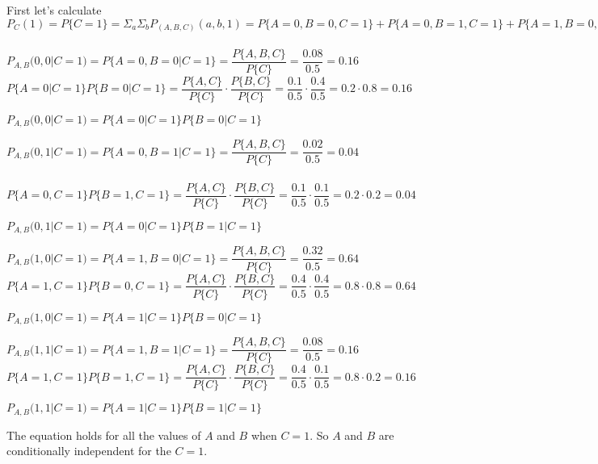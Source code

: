 \documentclass[12pt]{article}
\begin{document}
First let's calculate \\
$P_{C}(1) = P\{C = 1\} = \Sigma_{a} \Sigma_{b} P_{(A, B, C)} (a, b, 1) = P\{A = 0, B = 0, C = 1\} + P\{A = 0, B = 1,C=1\} + P\{A=1, B=0, C=1\} + P\{A= 1, B =1, C = 1\} = 0.08+0.02+0.32+0.08 = 0.5$ \\ \\
$P_{A, B}(0, 0| C = 1) = P\{A = 0 , B = 0 | C = 1\} = \dfrac{P\{A , B , C\}}{P\{C\}} = \dfrac{0.08}{0.5} = 0.16$ \\
$P\{A = 0 | C = 1\}P\{B = 0 | C = 1\} = \dfrac{P\{A , C\}}{P\{C\}} \cdot \dfrac{P\{B , C \}}{P\{C\}} = \dfrac{0.1}{0.5}\cdot\dfrac{0.4}{0.5} = 0.2 \cdot 0.8 = 0.16$ \\ 
\begin{center}
    $P_{A, B}(0, 0| C = 1) = P\{A = 0 | C = 1\}P\{B = 0 | C = 1\}$ \\ 
\end{center} 
$P_{A, B}(0, 1| C = 1) = P\{A = 0 , B = 1 | C = 1\} = \dfrac{P\{A , B , C\}}{P\{C\}} = \dfrac{0.02}{0.5} = 0.04$\\ \\
$P\{A = 0 , C = 1\}P\{B = 1 , C = 1\} = \dfrac{P\{A , C\}}{P\{C\}} \cdot \dfrac{P\{B , C \}}{P\{C\}} = \dfrac{0.1}{0.5}\cdot\dfrac{0.1}{0.5} = 0.2 \cdot 0.2 = 0.04$ \\ 
\begin{center}
    $P_{A, B}(0, 1| C = 1) = P\{A = 0 | C = 1\}P\{B = 1 | C = 1\}$ \\ 
\end{center}
$P_{A, B}(1, 0| C = 1) = P\{A = 1 , B = 0 | C = 1\} = \dfrac{P\{A , B , C\}}{P\{C\}} = \dfrac{0.32}{0.5} = 0.64$ \\
$P\{A = 1 , C = 1\}P\{B = 0 , C = 1\} = \dfrac{P\{A , C\}}{P\{C\}} \cdot \dfrac{P\{B , C \}}{P\{C\}} = \dfrac{0.4}{0.5}\cdot\dfrac{0.4}{0.5} = 0.8 \cdot 0.8 = 0.64$ \\ 
\begin{center}
    $P_{A, B}(1, 0| C = 1) = P\{A = 1 | C = 1\}P\{B = 0 | C = 1\}$ \\ 
\end{center} 
$P_{A, B}(1, 1| C = 1) = P\{A = 1 , B = 1 | C = 1\} = \dfrac{P\{A , B , C\}}{P\{C\}} = \dfrac{0.08}{0.5} = 0.16$ \\
$P\{A = 1 , C = 1\}P\{B = 1 , C = 1\} = \dfrac{P\{A , C\}}{P\{C\}} \cdot \dfrac{P\{B , C \}}{P\{C\}} = \dfrac{0.4}{0.5}\cdot\dfrac{0.1}{0.5} = 0.8 \cdot 0.2 = 0.16$ \\ 
\begin{center}
    $P_{A, B}(1, 1| C = 1) = P\{A = 1 | C = 1\}P\{B = 1 | C = 1\}$ \\ 
\end{center}

The equation holds for all the values of $A$ and $B$ when $C = 1$. So $A$ and $B$ are conditionally independent for the $C = 1$.
\end{document}
